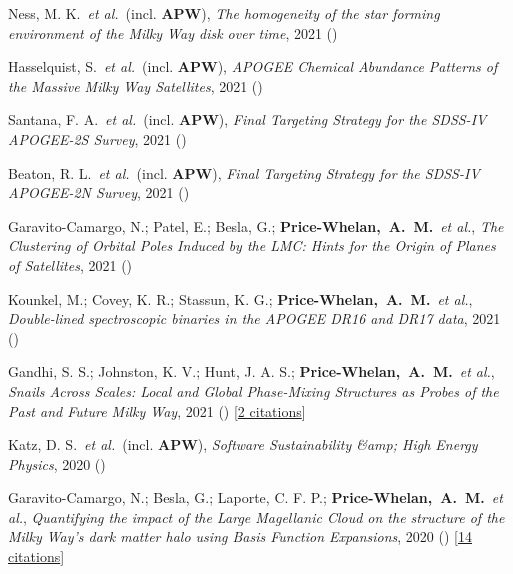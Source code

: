\item[{\color{deemph}\scriptsize17}]Ness, M. K.~\textit{et al.}~(incl. \textbf{APW}), \textit{The homogeneity of the star forming environment of the Milky Way disk over time}, 2021 ()

\item[{\color{deemph}\scriptsize16}]Hasselquist, S.~\textit{et al.}~(incl. \textbf{APW}), \textit{APOGEE Chemical Abundance Patterns of the Massive Milky Way Satellites}, 2021 ()

\item[{\color{deemph}\scriptsize15}]Santana, F. A.~\textit{et al.}~(incl. \textbf{APW}), \textit{Final Targeting Strategy for the SDSS-IV APOGEE-2S Survey}, 2021 ()

\item[{\color{deemph}\scriptsize14}]Beaton, R. L.~\textit{et al.}~(incl. \textbf{APW}), \textit{Final Targeting Strategy for the SDSS-IV APOGEE-2N Survey}, 2021 ()

\item[{\color{deemph}\scriptsize13}]Garavito-Camargo, N.; Patel, E.; Besla, G.; \textbf{Price-Whelan,~A.~M.}~\textit{et al.}, \textit{The Clustering of Orbital Poles Induced by the LMC: Hints for the Origin of Planes of Satellites}, 2021 ()

\item[{\color{deemph}\scriptsize12}]Kounkel, M.; Covey, K. R.; Stassun, K. G.; \textbf{Price-Whelan,~A.~M.}~\textit{et al.}, \textit{Double-lined spectroscopic binaries in the APOGEE DR16 and DR17 data}, 2021 ()

\item[{\color{deemph}\scriptsize11}]Gandhi, S. S.; Johnston, K. V.; Hunt, J. A. S.; \textbf{Price-Whelan,~A.~M.}~\textit{et al.}, \textit{Snails Across Scales: Local and Global Phase-Mixing Structures as Probes of the Past and Future Milky Way}, 2021 () [\href{http://adsabs.harvard.edu/abs/2021arXiv210703562G}{2 citations}]

\item[{\color{deemph}\scriptsize10}]Katz, D. S.~\textit{et al.}~(incl. \textbf{APW}), \textit{Software Sustainability {\&}amp; High Energy Physics}, 2020 ()

\item[{\color{deemph}\scriptsize9}]Garavito-Camargo, N.; Besla, G.; Laporte, C. F. P.; \textbf{Price-Whelan,~A.~M.}~\textit{et al.}, \textit{Quantifying the impact of the Large Magellanic Cloud on the structure of the Milky Way's dark matter halo using Basis Function Expansions}, 2020 () [\href{http://adsabs.harvard.edu/abs/2020arXiv201000816G}{14 citations}]


